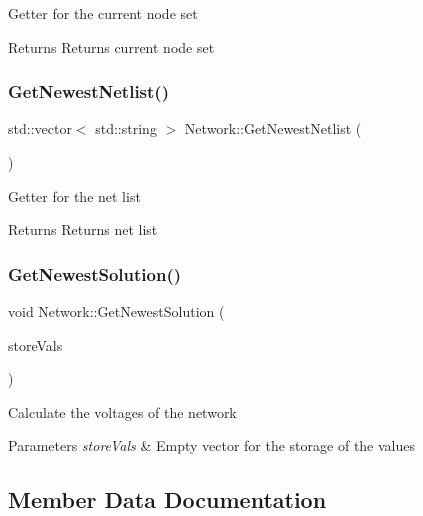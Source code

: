 Getter for the current node set \begin{DoxyReturn}{Returns}
Returns current node set 
\end{DoxyReturn}
\mbox{\label{classNetwork_addae3802a581406208810ce430a045f9}} 
\subsubsection{\texorpdfstring{Get\+Newest\+Netlist()}{GetNewestNetlist()}}
{\footnotesize\ttfamily std\+::vector$<$ std\+::string $>$ Network\+::\+Get\+Newest\+Netlist (\begin{DoxyParamCaption}{ }\end{DoxyParamCaption})}

Getter for the net list \begin{DoxyReturn}{Returns}
Returns net list 
\end{DoxyReturn}
\mbox{\label{classNetwork_a0a1cbddfc25e2705cb46a58f1e385376}} 
\subsubsection{\texorpdfstring{Get\+Newest\+Solution()}{GetNewestSolution()}}
{\footnotesize\ttfamily void Network\+::\+Get\+Newest\+Solution (\begin{DoxyParamCaption}\item[{std\+::vector$<$ \hyperlink{structMeasureVal}{Measure\+Val} $>$ \&}]{store\+Vals }\end{DoxyParamCaption})}

Calculate the voltages of the network 
\begin{DoxyParams}{Parameters}
{\em store\+Vals} & Empty vector for the storage of the values \\
\hline
\end{DoxyParams}


\subsection{Member Data Documentation}
\mbox{\label{classNetwork_a4ee230b842728a61f416cb5a64c5dfb9}} 
